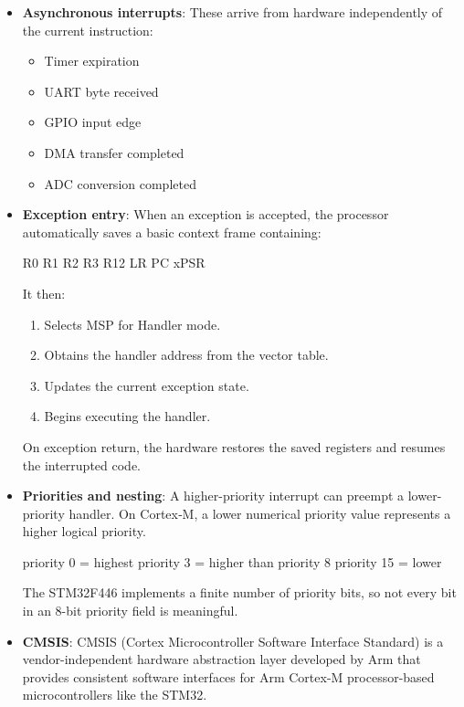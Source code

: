 \documentclass{report}
\begin{document}
\begin{itemize}
        \item \textbf{Asynchronous interrupts}: These arrive from hardware independently of the current instruction:
            \begin{itemize}
                \item Timer expiration
                \item UART byte received
                \item GPIO input edge
                \item DMA transfer completed
                \item ADC conversion completed
            \end{itemize}
        \item \textbf{Exception entry}: When an exception is accepted, the processor automatically saves a basic context frame containing:
            \bigbreak \noindent 
            \begin{ccode}
                R0
                R1
                R2
                R3
                R12
                LR
                PC
                xPSR
            \end{ccode}
            \bigbreak \noindent 
            It then:
            \begin{enumerate}
                \item Selects MSP for Handler mode.
                \item Obtains the handler address from the vector table.
                \item Updates the current exception state.
                \item Begins executing the handler.
            \end{enumerate}
            On exception return, the hardware restores the saved registers and resumes the interrupted code.
        \item \textbf{Priorities and nesting}: A higher-priority interrupt can preempt a lower-priority handler. On Cortex‑M, a lower numerical priority value represents a higher logical priority.
            \bigbreak \noindent 
            \begin{ccode}
                priority 0  = highest
                priority 3  = higher than priority 8
                priority 15 = lower
            \end{ccode}
            \bigbreak \noindent 
            The STM32F446 implements a finite number of priority bits, so not every bit in an 8-bit priority field is meaningful.
        \item \textbf{CMSIS}: CMSIS (Cortex Microcontroller Software Interface Standard) is a vendor-independent hardware abstraction layer developed by Arm that provides consistent software interfaces for Arm Cortex-M processor-based microcontrollers like the STM32.

\end{itemize}
\end{document}
